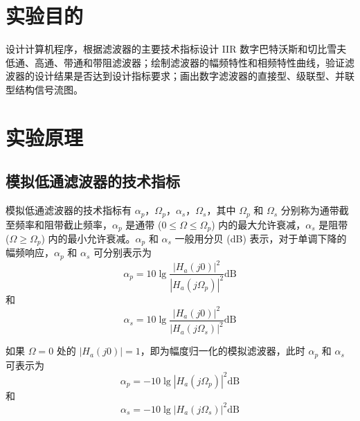 \documentclass[12pt,AutoFakeBold]{article}
\begin{document}
\maketitle
\setcounter{tocdepth}{2}
\tableofcontents  %

\makeatletter
\begin{center}
    \LARGE \textbf{\textsf{\@problem}}
\end{center}
\makeatother

\section{实验目的}

设计计算机程序，根据滤波器的主要技术指标设计 IIR 数字巴特沃斯和切比雪夫低通、高通、带通和带阻滤波器；绘制滤波器的幅频特性和相频特性曲线，验证滤波器的设计结果是否达到设计指标要求；画出数字滤波器的直接型、级联型、并联型结构信号流图。

\section{实验原理}

\subsection{模拟低通滤波器的技术指标}

模拟低通滤波器的技术指标有 $\alpha_p$，$\Omega_p$，$\alpha_s$，$\Omega_s$，其中 $\Omega_p$ 和 $\Omega_s$ 分别称为通带截至频率和阻带截止频率，$\alpha_p$ 是通带 ($0\le\Omega\le\Omega_p$) 内的最大允许衰减，$\alpha_s$ 是阻带 ($\Omega\ge\Omega_p$) 内的最小允许衰减。$\alpha_p$ 和 $\alpha_s$ 一般用分贝 (dB) 表示，对于单调下降的幅频响应，$\alpha_p$ 和 $\alpha_s$ 可分别表示为
%
\begin{equation} \label{eq:1}
\alpha_p=10\lg\frac{|H_a(j0)|^2}{|H_a(j\Omega_p)|^2}\mathrm{dB}
\end{equation}
%
和
%
\begin{equation} \label{eq:2}
\alpha_s=10\lg\frac{|H_a(j0)|^2}{|H_a(j\Omega_s)|^2}\mathrm{dB}
\end{equation}
%

如果 $\Omega=0$ 处的 $|H_a(j0)|=1$，即为幅度归一化的模拟滤波器，此时 $\alpha_p$ 和 $\alpha_s$ 可表示为
%
\begin{equation}
\alpha_p=-10\lg|H_a(j\Omega_p)|^2\mathrm{dB}
\end{equation}
%
和
%
\begin{equation}
\alpha_s=-10\lg|H_a(j\Omega_s)|^2\mathrm{dB}
\end{equation}
%
\end{document}
